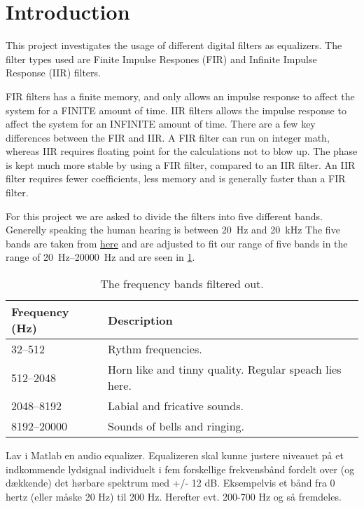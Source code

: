 
\section{Introduction}
This project investigates the usage of different digital filters as equalizers. The filter types used are Finite Impulse Respones (FIR) and Infinite Impulse Response (IIR) filters.

FIR filters has a finite memory, and only allows an impulse response to affect the system for a FINITE amount of time.
IIR filters allows the impulse response to affect the system for an INFINITE amount of time.
There are a few key differences between the FIR and IIR.
A FIR filter can run on integer math, whereas IIR requires floating point for the calculations not to blow up. The phase is kept much more stable by using a FIR filter, compared to an IIR filter.
An IIR filter requires fewer coefficients, less memory and is generally faster than a FIR filter.

For this project we are asked to divide the filters into five different bands. Generelly speaking the human hearing is between \SI{20}{\hertz} and \SI{20}{\kilo\hertz} The five bands are taken from \href{https://en.wikipedia.org/wiki/Audio\_frequency}{here} and are adjusted to fit our range of five bands in the range of \SIrange{20}{20000}{\hertz} and are seen in \cref{tab:FiveBand}.

\begin{table}[h]
	\caption{The frequency bands filtered out.}
	\label{tab:FiveBand}
	\begin{tabularx}{\textwidth}{X X}
		\textbf{Frequency} (\si{\hertz})	& \textbf{Description} \\
		\toprule
		\numrange{32}{512}		& Rythm frequencies. \\
		\numrange{512}{2048}	& Horn like and tinny quality. Regular speach lies here. \\
		\numrange{2048}{8192}	& Labial and fricative sounds. \\
		\numrange{8192}{20000}	& Sounds of bells and ringing. \\
	\end{tabularx}
\end{table}

Lav i Matlab en audio equalizer. Equalizeren skal kunne justere niveauet på et indkommende lydsignal individuelt i fem forskellige frekvensbånd fordelt over (og dækkende) det hørbare spektrum med +/- 12 dB. Eksempelvis et bånd fra 0 hertz (eller måske 20 Hz) til 200 Hz. Herefter evt. 200-700 Hz og så fremdeles.

